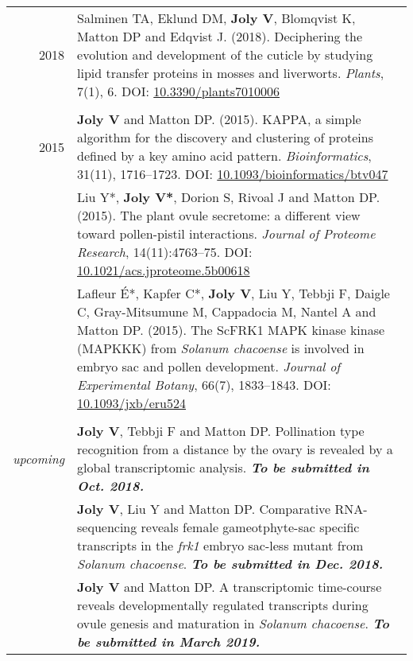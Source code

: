 \documentclass[letterpaper,12pt]{article}
\begin{document}
\begin{tabularx}{\textwidth}{@{}r|X@{}}

2018
& Salminen TA, Eklund DM, \textbf{Joly V}, Blomqvist K, Matton DP
  and Edqvist J. (2018).
  Deciphering the evolution and development of the cuticle by studying lipid
  transfer proteins in mosses and liverworts.
  \emph{Plants}, 7(1), 6.
  DOI: \href{http://doi.org/10.3390/plants7010006}{10.3390/plants7010006}
  \\

\multicolumn{2}{c}{} \\

2015
& \textbf{Joly V} and Matton DP. (2015).
  KAPPA, a simple algorithm for the discovery and clustering of proteins defined
  by a key amino acid pattern.
  \emph{Bioinformatics}, 31(11), 1716--1723.
  DOI: \href{http://doi.org/10.1093/bioinformatics/btv047}
  {10.1093/bioinformatics/btv047}
  \vspace{3mm}
  \\

& Liu Y*, \textbf{Joly V*}, Dorion S, Rivoal J and Matton DP. (2015).
  The plant ovule secretome: a different view toward pollen-pistil interactions.
  \emph{Journal of Proteome Research}, 14(11):4763--75.
  DOI: \href{http://doi.org/10.1021/acs.jproteome.5b00618}
  {10.1021/acs.jproteome.5b00618}
  \vspace{3mm}
  \\

& Lafleur É*, Kapfer C*, \textbf{Joly V}, Liu Y, Tebbji F, Daigle C,
  Gray-Mitsumune M, Cappadocia M, Nantel A and Matton DP. (2015).
  The ScFRK1 MAPK kinase kinase (MAPKKK) from \emph{Solanum chacoense} is
  involved in embryo sac and pollen development.
  \emph{Journal of Experimental Botany}, 66(7), 1833--1843.
  DOI: \href{http://doi.org/10.1093/jxb/eru524}{10.1093/jxb/eru524}
  \\

\multicolumn{2}{c}{} \\

{\em upcoming}
& \textbf{Joly V}, Tebbji F and Matton DP.
  Pollination type recognition from a distance by the ovary is revealed by a
  global transcriptomic analysis.
  {\bfseries\em To be submitted in Oct. 2018.}
  \vspace{3mm}
  \\

& \textbf{Joly V}, Liu Y and Matton DP.
  Comparative RNA-sequencing reveals female gameotphyte-sac specific transcripts
  in the \emph{frk1} embryo sac-less mutant from \emph{Solanum chacoense}.
  {\bfseries\em To be submitted in Dec. 2018.}
  \vspace{3mm}
  \\

& \textbf{Joly V} and Matton DP.
  A transcriptomic time-course reveals developmentally regulated transcripts
  during ovule genesis and maturation in \emph{Solanum chacoense}.
  {\bfseries\em To be submitted in March 2019.} \\

\end{tabularx}
\end{document}
